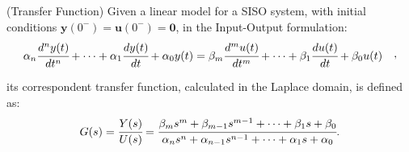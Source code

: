 \documentclass[a4paper,11pt]{book}
\numberwithin{figure}{chapter}
\numberwithin{equation}{chapter}
\numberwithin{table}{chapter}
\theoremstyle{definition}
\newtheorem{definition}{Definition}[chapter]
\newcounter{boxed-theorem}
\newcounter{boxed-definition}
\newenvironment{boxed-definition}[1]
{\colorlet{shadecolor}{pastelYellow!15} \begin{shaded} \begin{definition}{#1}}
{\end{definition} \end{shaded}}
\newcounter{boxed-example}
\begin{document}
\begin{boxed-definition}{(Transfer Function)} \label{th:transFun01}
    Given a linear model for a SISO system, with initial conditions $\bm{y}(0^-) = \bm{u}(0^-) = \bm{0}$, in the Input-Output formulation:
    \begin{equation}
    \begin{split}
        \alpha_n \cfrac{d^n y(t)}{dt^n} + \cdots + \alpha_{1} \cfrac{d y(t)}{dt} + \alpha_{0} y(t) &= \beta_m \cfrac{d^m u(t)}{dt^m} + \cdots + \beta_{1} \cfrac{d u(t)}{dt} + \beta_{0} u(t)
    \end{split}
    ,\end{equation}
    
\noindent its correspondent transfer function, calculated in the Laplace domain, is defined as:
    \begin{equation} \label{eq:transFun01}
         G(s) = \cfrac{Y(s)}{U(s)} = \cfrac{\beta_m s^m + \beta_{m-1} s^{m-1} + \cdots + \beta_{1} s + \beta_0}{\alpha_n s^n + \alpha_{n-1} s^{n-1} + \cdots + \alpha_{1} s + \alpha_0}
    .\end{equation}
\end{boxed-definition}
\end{document}
